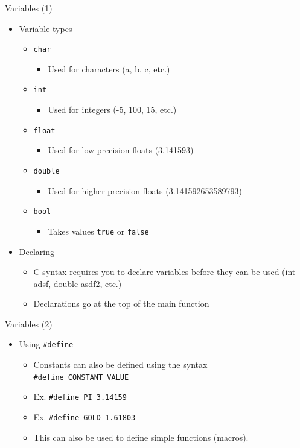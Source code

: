 \documentclass[compress]{beamer}
\begin{document}
    \begin{frame}{Variables (1)}
    	\begin{itemize}
    		\item Variable types
    		\begin{itemize}
    			\item \texttt{char}
    			\begin{itemize}
    				\item Used for characters (a, b, c, etc.)
    			\end{itemize}
    			\item \texttt{int}
    			\begin{itemize}
    				\item Used for integers (-5, 100, 15, etc.)
    			\end{itemize}
    			\item \texttt{float}
    			\begin{itemize}
    				\item Used for low precision floats (3.141593)
    			\end{itemize}
    			\item \texttt{double}
    			\begin{itemize}
    				\item Used for higher precision floats (3.141592653589793)
    			\end{itemize}
    			\item \texttt{bool}
    			\begin{itemize}
    				\item Takes values \texttt{true} or \texttt{false}
    			\end{itemize}
    		\end{itemize}
    		\item Declaring
    		\begin{itemize}
    			\item C syntax requires you to declare variables before they can be used (int adsf, double asdf2, etc.)
    			\item Declarations go at the top of the main function
    		\end{itemize}
    	\end{itemize}
    \end{frame}
    
    \begin{frame}{Variables (2)}
    	\begin{itemize}
    		\item Using \texttt{\#define}
    		\begin{itemize}
    			\item Constants can also be defined using the syntax \\ \texttt{\#define CONSTANT VALUE}
    			\item Ex. \texttt{\#define PI 3.14159}
    			\item Ex. \texttt{\#define GOLD 1.61803}
    			\item This can also be used to define simple functions (macros).
    		\end{itemize}
    	\end{itemize}
    \end{frame}
    
\end{document}
